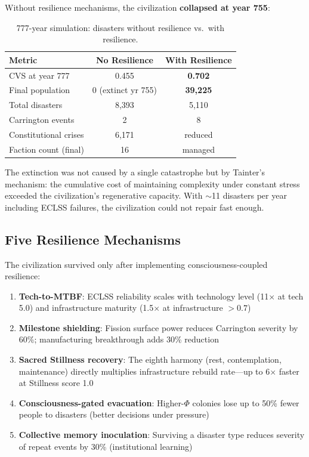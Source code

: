 \documentclass[12pt,a4paper]{article}
\begin{document}
Without resilience mechanisms, the civilization \textbf{collapsed at year 755}:

\begin{table}[h]
\centering
\caption{777-year simulation: disasters without resilience vs.\ with resilience.}
\label{tab:disasters}
\begin{tabular}{@{}lcc@{}}
\toprule
\textbf{Metric} & \textbf{No Resilience} & \textbf{With Resilience} \\
\midrule
CVS at year 777      & 0.455               & \textbf{0.702} \\
Final population     & 0 (extinct yr 755)  & \textbf{39,225} \\
Total disasters      & 8,393               & 5,110 \\
Carrington events    & 2                   & 8 \\
Constitutional crises & 6,171              & reduced \\
Faction count (final) & 16                 & managed \\
\bottomrule
\end{tabular}
\end{table}

The extinction was not caused by a single catastrophe but by Tainter's mechanism: the cumulative cost of maintaining complexity under constant stress exceeded the civilization's regenerative capacity. With $\sim$11 disasters per year including ECLSS failures, the civilization could not repair fast enough.

\subsection{Five Resilience Mechanisms}

The civilization survived only after implementing consciousness-coupled resilience:

\begin{enumerate}
    \item \textbf{Tech-to-MTBF}: ECLSS reliability scales with technology level (11$\times$ at tech 5.0) and infrastructure maturity (1.5$\times$ at infrastructure $> 0.7$)
    \item \textbf{Milestone shielding}: Fission surface power reduces Carrington severity by 60\%; manufacturing breakthrough adds 30\% reduction
    \item \textbf{Sacred Stillness recovery}: The eighth harmony (rest, contemplation, maintenance) directly multiplies infrastructure rebuild rate---up to 6$\times$ faster at Stillness score 1.0
    \item \textbf{Consciousness-gated evacuation}: Higher-$\Phi$ colonies lose up to 50\% fewer people to disasters (better decisions under pressure)
    \item \textbf{Collective memory inoculation}: Surviving a disaster type reduces severity of repeat events by 30\% (institutional learning)
\end{enumerate}
\end{document}
